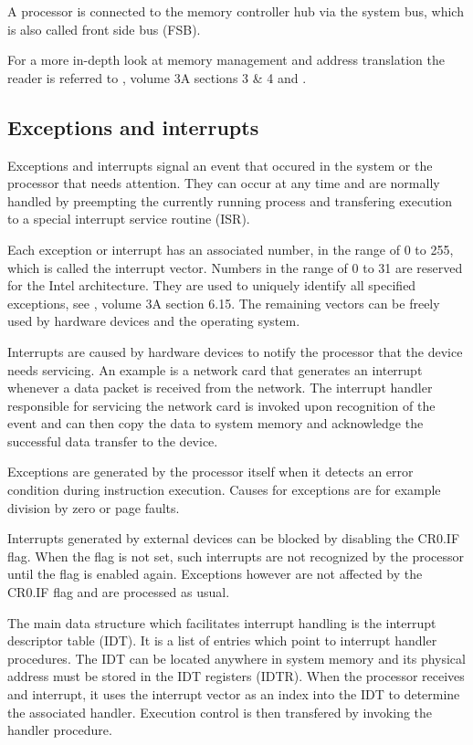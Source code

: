 A processor is connected to the memory controller hub via the system bus, which
is also called front side bus (FSB).

For a more in-depth look at memory management and address translation the reader
is referred to \cite{IntelSDM}, volume 3A sections 3 \& 4 and
\cite{Drepper07whatevery}.

\subsection{Exceptions and interrupts}\label{subsec:exceptions-interrupts}
Exceptions and interrupts signal an event that occured in the system or the
processor that needs attention. They can occur at any time and are normally
handled by preempting the currently running process and transfering execution to
a special interrupt service routine (ISR).

Each exception or interrupt has an associated number, in the range of 0 to 255,
which is called the interrupt vector. Numbers in the range of 0 to 31 are
reserved for the Intel architecture. They are used to uniquely identify all
specified exceptions, see \cite{IntelSDM}, volume 3A section 6.15. The remaining
vectors can be freely used by hardware devices and the operating system.

Interrupts are caused by hardware devices to notify the processor that the
device needs servicing. An example is a network card that generates an interrupt
whenever a data packet is received from the network. The interrupt handler
responsible for servicing the network card is invoked upon recognition of the
event and can then copy the data to system memory and acknowledge the successful
data transfer to the device.

Exceptions are generated by the processor itself when it detects an error
condition during instruction execution. Causes for exceptions are for example
division by zero or page faults.

Interrupts generated by external devices can be blocked by disabling the CR0.IF
flag. When the flag is not set, such interrupts are not recognized by the
processor until the flag is enabled again. Exceptions however are not affected
by the CR0.IF flag and are processed as usual.

The main data structure which facilitates interrupt handling is the interrupt
descriptor table (IDT). It is a list of entries which point to
interrupt handler procedures. The IDT can be located anywhere in system memory
and its physical address must be stored in the IDT registers (IDTR). When the
processor receives and interrupt, it uses the interrupt vector as an index into
the IDT to determine the associated handler. Execution control is then
transfered by invoking the handler procedure.

